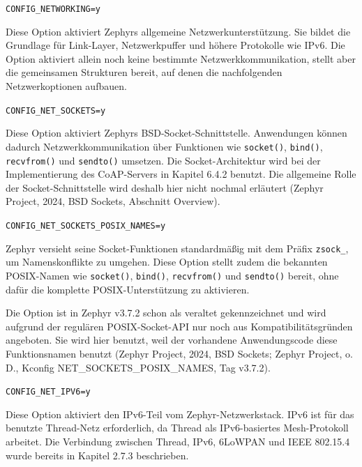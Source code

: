 \lstinline[style=fileinline]|CONFIG_NETWORKING=y|

Diese Option aktiviert Zephyrs allgemeine Netzwerkunterst{\"u}tzung. Sie bildet die Grundlage f{\"u}r Link-Layer, Netzwerkpuffer und h{\"o}here Protokolle wie IPv6. Die Option aktiviert allein noch keine bestimmte Netzwerkkommunikation, stellt aber die gemeinsamen Strukturen bereit, auf denen die nachfolgenden Netzwerkoptionen aufbauen.

\lstinline[style=fileinline]|CONFIG_NET_SOCKETS=y|

Diese Option aktiviert Zephyrs BSD-Socket-Schnittstelle. Anwendungen k{\"o}nnen dadurch Netzwerkkommunikation {\"u}ber Funktionen wie \lstinline[style=fileinline]|socket()|, \lstinline[style=fileinline]|bind()|, \lstinline[style=fileinline]|recvfrom()| und \lstinline[style=fileinline]|sendto()| umsetzen. Die Socket-Architektur wird bei der Implementierung des CoAP-Servers in Kapitel 6.4.2 benutzt. Die allgemeine Rolle der Socket-Schnittstelle wird deshalb hier nicht nochmal erl{\"a}utert (Zephyr Project, 2024, \glqq{}BSD Sockets\grqq{}, Abschnitt \glqq{}Overview\grqq{}).

\lstinline[style=fileinline]|CONFIG_NET_SOCKETS_POSIX_NAMES=y|

Zephyr versieht seine Socket-Funktionen standardm{\"a}{\ss}ig mit dem Pr{\"a}fix \lstinline[style=fileinline]|zsock_|, um Namenskonflikte zu umgehen. Diese Option stellt zudem die bekannten POSIX-Namen wie \lstinline[style=fileinline]|socket()|, \lstinline[style=fileinline]|bind()|, \lstinline[style=fileinline]|recvfrom()| und \lstinline[style=fileinline]|sendto()| bereit, ohne daf{\"u}r die komplette POSIX-Unterst{\"u}tzung zu aktivieren.

Die Option ist in Zephyr v3.7.2 schon als veraltet gekennzeichnet und wird aufgrund der regul{\"a}ren POSIX-Socket-API nur noch aus Kompatibilit{\"a}tsgr{\"u}nden angeboten. Sie wird hier benutzt, weil der vorhandene Anwendungscode diese Funktionsnamen benutzt (Zephyr Project, 2024, \glqq{}BSD Sockets\grqq{}; Zephyr Project, o. D., Kconfig NET\_SOCKETS\_POSIX\_NAMES, Tag v3.7.2).

\lstinline[style=fileinline]|CONFIG_NET_IPV6=y|

Diese Option aktiviert den IPv6-Teil vom Zephyr-Netzwerkstack. IPv6 ist f{\"u}r das benutzte Thread-Netz erforderlich, da Thread als IPv6-basiertes Mesh-Protokoll arbeitet. Die Verbindung zwischen Thread, IPv6, 6LoWPAN und IEEE 802.15.4 wurde bereits in Kapitel 2.7.3 beschrieben.

